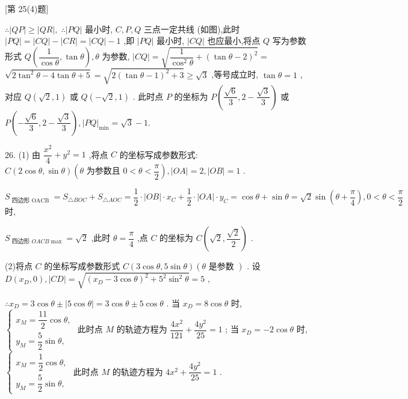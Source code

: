 [第 25(4)题]

$\therefore \left| {QP}\right|  \geq  \left| {QR}\right| ,\;\therefore \left| {PQ}\right|$ 最小时, $C,P,Q$ 三点一定共线 (如图),此时 $\left| {PQ}\right|  = \left| {CQ}\right|  - \left| {CR}\right|  = \left| {CQ}\right|  - 1$ ,即 $\left| {PQ}\right|$ 最小时, $\left| {CQ}\right|$ 也应最小,将点 $Q$ 写为参数形式 $Q\left( {\dfrac{1}{\cos \theta },\tan \theta }\right) ,\theta$ 为参数, $\left| {CQ}\right|  = \sqrt{\dfrac{1}{{\cos }^{2}\theta } + {\left( \tan \theta  - 2\right) }^{2}} =$  $\sqrt{2{\tan }^{2}\theta  - 4\tan \theta  + 5} = \sqrt{2{\left( \tan \theta  - 1\right) }^{2} + 3} \geq  \sqrt{3}$ ,等号成立时, $\tan \theta  = 1$ ,对应 $Q\left( {\sqrt{2},1}\right)$ 或 $Q\left( {-\sqrt{2},1}\right)$ . 此时点 $P$ 的坐标为 $P\left( {\dfrac{\sqrt{6}}{3},2 - \dfrac{\sqrt{3}}{3}}\right)$ 或 $P\left( {-\dfrac{\sqrt{6}}{3},2 - \dfrac{\sqrt{3}}{3}}\right) ,{\left| PQ\right| }_{\min } = \sqrt{3} - 1.$

26. (1) 由 $\dfrac{{x}^{2}}{4} + {y}^{2} = 1$ ,将点 $C$ 的坐标写成参数形式: $C\left( {2\cos \theta ,\sin \theta }\right) \left( {\theta \text{ 为参数且 }0 < \theta  < \dfrac{\pi }{2}}\right) ,\left| {OA}\right|  = 2,\left| {OB}\right|  = 1$ .

${S}_{\text{ 四边形 OACB }} = {S}_{\bigtriangleup {BOC}} + {S}_{\bigtriangleup {AOC}} = \dfrac{1}{2} \cdot  \left| {OB}\right|  \cdot  {x}_{C} + \dfrac{1}{2} \cdot  \left| {OA}\right|  \cdot  {y}_{C} = \cos \theta  + \sin \theta  = \sqrt{2}\sin \left( {\theta  + \dfrac{\pi }{4}}\right) ,0 < \theta  < \dfrac{\pi }{2}$ 时,

${S}_{\text{ 四边形 }{OACB}\max } = \sqrt{2}$ ,此时 $\theta  = \dfrac{\pi }{4}$ ,点 $C$ 的坐标为 $C\left( {\sqrt{2},\dfrac{\sqrt{2}}{2}}\right)$ .

(2)将点 $C$ 的坐标写成参数形式 $C\left( {3\cos \theta ,5\sin \theta }\right) \left( {\theta \text{ 是参数 }}\right)$ . 设 $D\left( {{x}_{D},0}\right) ,\left| {CD}\right|  = \sqrt{{\left( {x}_{D} - 3\cos \theta \right) }^{2} + {5}^{2}{\sin }^{2}\theta } = 5$ ,

$\therefore {x}_{D} = 3\cos \theta  \pm  \left| {5\cos \theta }\right|  = 3\cos \theta  \pm  5\cos \theta$ . 当 ${x}_{D} = 8\cos \theta$ 时, $\left\{  \begin{array}{l} {x}_{M} = \dfrac{11}{2}\cos \theta , \\  {y}_{M} = \dfrac{5}{2}\sin \theta , \end{array}\right.$ 此时点 $M$ 的轨迹方程为 $\dfrac{4{x}^{2}}{121} + \dfrac{4{y}^{2}}{25} = 1$ ; 当 ${x}_{D} =  - 2\cos \theta$ 时, $\left\{  \begin{array}{l} {x}_{M} = \dfrac{1}{2}\cos \theta , \\  {y}_{M} = \dfrac{5}{2}\sin \theta , \end{array}\right.$ 此时点 $M$ 的轨迹方程为 $4{x}^{2} + \dfrac{4{y}^{2}}{25} = 1$ .


